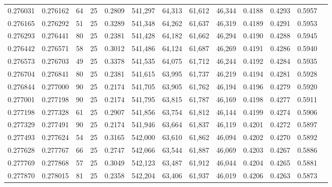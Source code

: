 \begin{tabular}{rrrrrrrrrrrrr}
0.276031 & 0.276162 &    64 &  25 &                                     0.2809 & 541,297 &  64,313 &  61,612 &  46,344 & 0.4188 & 0.4293 & 0.5957 \\
0.276165 & 0.276292 &    51 &  25 &                                     0.3289 & 541,348 &  64,262 &  61,637 &  46,319 & 0.4189 & 0.4291 & 0.5953 \\
0.276293 & 0.276441 &    80 &  25 &                                     0.2381 & 541,428 &  64,182 &  61,662 &  46,294 & 0.4190 & 0.4288 & 0.5945 \\
0.276442 & 0.276571 &    58 &  25 &                                     0.3012 & 541,486 &  64,124 &  61,687 &  46,269 & 0.4191 & 0.4286 & 0.5940 \\
0.276573 & 0.276703 &    49 &  25 &                                     0.3378 & 541,535 &  64,075 &  61,712 &  46,244 & 0.4192 & 0.4284 & 0.5935 \\
0.276704 & 0.276841 &    80 &  25 &                                     0.2381 & 541,615 &  63,995 &  61,737 &  46,219 & 0.4194 & 0.4281 & 0.5928 \\
0.276844 & 0.277000 &    90 &  25 &                                     0.2174 & 541,705 &  63,905 &  61,762 &  46,194 & 0.4196 & 0.4279 & 0.5920 \\
0.277001 & 0.277198 &    90 &  25 &                                     0.2174 & 541,795 &  63,815 &  61,787 &  46,169 & 0.4198 & 0.4277 & 0.5911 \\
0.277198 & 0.277328 &    61 &  25 &                                     0.2907 & 541,856 &  63,754 &  61,812 &  46,144 & 0.4199 & 0.4274 & 0.5906 \\
0.277329 & 0.277491 &    90 &  25 &                                     0.2174 & 541,946 &  63,664 &  61,837 &  46,119 & 0.4201 & 0.4272 & 0.5897 \\
0.277493 & 0.277624 &    54 &  25 &                                     0.3165 & 542,000 &  63,610 &  61,862 &  46,094 & 0.4202 & 0.4270 & 0.5892 \\
0.277628 & 0.277767 &    66 &  25 &                                     0.2747 & 542,066 &  63,544 &  61,887 &  46,069 & 0.4203 & 0.4267 & 0.5886 \\
0.277769 & 0.277868 &    57 &  25 &                                     0.3049 & 542,123 &  63,487 &  61,912 &  46,044 & 0.4204 & 0.4265 & 0.5881 \\
0.277870 & 0.278015 &    81 &  25 &                                     0.2358 & 542,204 &  63,406 &  61,937 &  46,019 & 0.4206 & 0.4263 & 0.5873 \\

\end{tabular}
